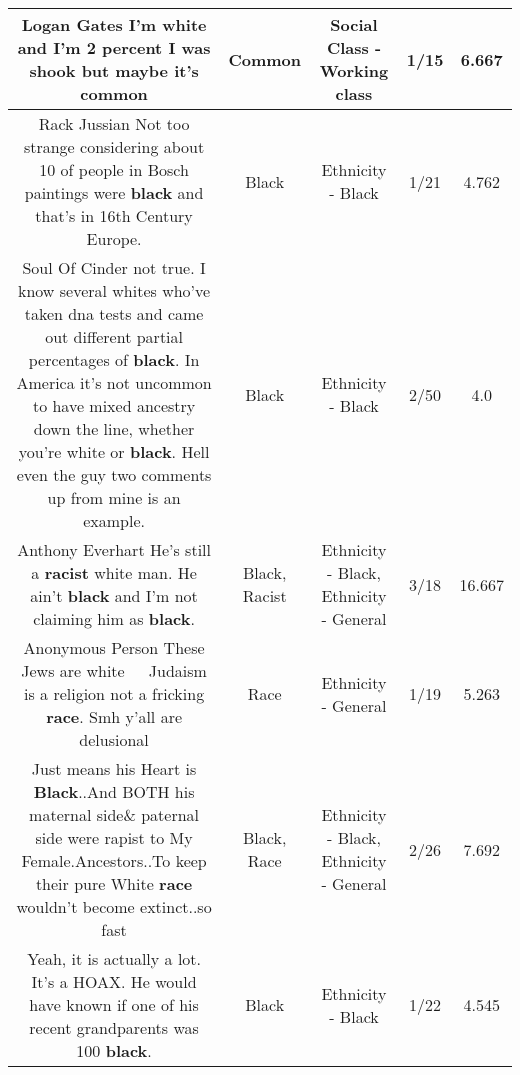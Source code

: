 \documentclass[11pt]{article}
\newlength\mylength
\begin{document}
\begin{center}
\begin{longtable}{|C{.65\mylength}|C{.30\mylength}|C{.12\mylength}|C{.12\mylength}|C{.12\mylength}|}
  \small Logan Gates I'm white and I'm 2 percent I was shook but maybe it's common\normalsize   & Common & Social Class - Working class & 1/15 & 6.667 \\  \hline
  \small Rack Jussian Not too strange considering about 10 of people in Bosch paintings were \textbf{black} and that's in 16th Century Europe.\normalsize   & Black & Ethnicity - Black & 1/21 & 4.762 \\  \hline
  \small Soul Of Cinder not true. I know several whites who've taken dna tests and came out different partial percentages of \textbf{black}. In America it's not uncommon to have mixed ancestry down the line, whether you're white or \textbf{black}. Hell even the guy two comments up from mine is an example.\normalsize   & Black & Ethnicity - Black & 2/50 & 4.0 \\  \hline
  \small Anthony Everhart   He's still a \textbf{racist} white man. He ain't \textbf{black} and I'm not claiming him as \textbf{black}.\normalsize   & Black, Racist & Ethnicity - Black, Ethnicity - General & 3/18 & 16.667 \\  \hline
  \small Anonymous Person    These Jews are white 🤦🏾‍♀️ Judaism is a religion not a fricking \textbf{race}. Smh y'all are delusional\normalsize   & Race & Ethnicity - General & 1/19 & 5.263 \\  \hline
  \small Just means his Heart is \textbf{Black}..And BOTH his maternal side\& paternal side were rapist to My Female.Ancestors..To keep their pure White \textbf{race} wouldn't become extinct..so fast\normalsize   & Black, Race & Ethnicity - Black, Ethnicity - General & 2/26 & 7.692 \\  \hline
  \small Yeah, it is actually a lot. It's a HOAX. He would have known if one of his recent grandparents was 100 \textbf{black}.\normalsize   & Black & Ethnicity - Black & 1/22 & 4.545 \\  \hline

\end{longtable}
\end{center}
\end{document}
